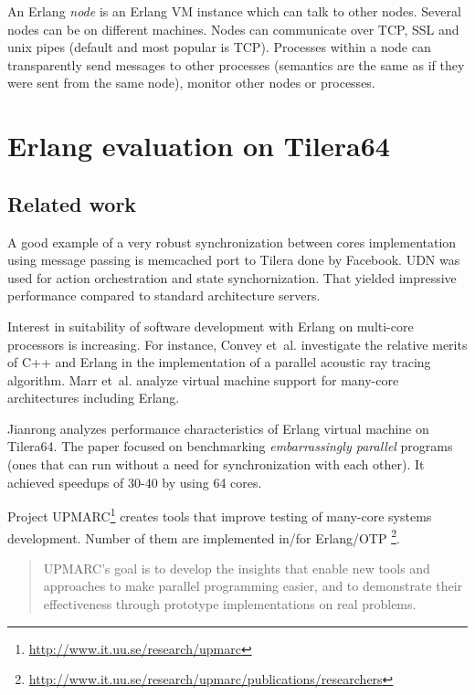 \documentclass[english,11pt]{l4proj}
\begin{document}
An Erlang {\em node} is an Erlang VM instance which can talk to other nodes.
Several nodes can be on different machines. Nodes can communicate over TCP, SSL
and unix pipes (default and most popular is TCP). Processes within a node can
transparently send messages to other processes (semantics are the same as if
they were sent from the same node), monitor other nodes or processes.

\section{Erlang evaluation on Tilera64}
\label{sec:erlang-eval}

\subsection{Related work}

A good example of a very robust synchronization between cores implementation
using message passing is memcached port to Tilera done by Facebook. UDN was used
for action orchestration and state synchornization\cite{facebook-tilera}. That
yielded impressive performance compared to standard architecture servers.

Interest in suitability of software development with Erlang on multi-core
processors is increasing. For instance, Convey et~al.\cite{erlang-acoustic}
investigate the relative merits of C++ and Erlang in the implementation of a
parallel acoustic ray tracing algorithm. Marr et~al.\cite{vm-manycore} analyze
virtual machine support for many-core architectures including Erlang.

Jianrong \cite{erlang-manycore-scalability} analyzes performance characteristics
of Erlang virtual machine on Tilera64. The paper focused on benchmarking
\emph{embarrassingly parallel} programs (ones that can run without a need for
synchronization with each other). It achieved speedups of 30-40 by using 64
cores.

Project UPMARC\footnote{\url{http://www.it.uu.se/research/upmarc}} creates tools
that improve testing of many-core systems development. Number of them are
implemented in/for
Erlang/OTP
\footnote{\url{http://www.it.uu.se/research/upmarc/publications/researchers}}.

\begin{quote}
UPMARC's goal is to develop the insights that enable new tools and approaches to
make parallel programming easier, and to demonstrate their effectiveness through
prototype implementations on real problems.
\end{quote}
\end{document}
